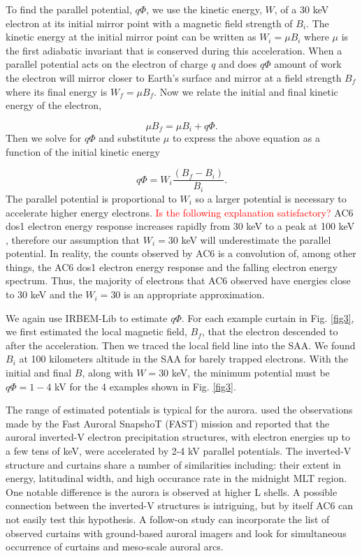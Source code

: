 \documentclass[draft]{agujournal2019}
\begin{document}
To find the parallel potential, $q \Phi$,  we use the kinetic energy, $W$, of a $30$ keV electron at its initial mirror point with a magnetic field strength of $B_i$. The kinetic energy at the initial mirror point can be written as $W_i = \mu B_i$ where $\mu$ is the first adiabatic invariant that is conserved during this acceleration. When a parallel potential acts on the electron of charge $q$ and does $q \Phi$ amount of work the electron will mirror closer to Earth's surface and mirror at a field strength $B_f$ where its final energy is $W_f = \mu B_f$. Now we relate the initial and final kinetic energy of the electron,

\begin{equation}
\mu B_f = \mu B_i + q \Phi.
\end{equation} Then we solve for $q \Phi$ and substitute $\mu$ to express the above equation as a function of the initial kinetic energy 

\begin{equation}
 q \Phi = W_i \frac{(B_f - B_i)}{B_i}.
\end{equation} The parallel potential is proportional to $W_i$ so a larger potential is necessary to accelerate higher energy electrons. \textcolor{red}{Is the following explanation satisfactory?} AC6 dos1 electron energy response increases rapidly from 30 keV to a peak at 100 keV \cite[Figure 2]{O'brien2019}, therefore our assumption that $W_i = 30$ keV will underestimate the parallel potential. In reality, the counts observed by AC6 is a convolution of, among other things, the AC6 dos1 electron energy response and the falling electron energy spectrum. Thus, the majority of electrons that AC6 observed have energies close to 30 keV and the $W_i = 30$ is an appropriate approximation.

We again use IRBEM-Lib to estimate $ q \Phi$. For each example curtain in Fig. \ref{fig3}, we first estimated the local magnetic field, $B_f$, that the electron descended to after the acceleration. Then we traced the local field line into the SAA. We found $B_i$ at 100 kilometers altitude in the SAA for barely trapped electrons. With the initial and final $B$, along with $W = 30$ keV, the minimum potential must be $q \Phi = 1-4$ kV for the 4 examples shown in Fig. \ref{fig3}. 

The range of estimated potentials is typical for the aurora.  used the observations made by the Fast Auroral SnapshoT (FAST) mission and reported that the auroral inverted-V electron precipitation structures, with electron energies up to a few tens of keV, were accelerated by 2-4 kV parallel potentials. The inverted-V structure and curtains share a number of similarities including: their extent in energy, latitudinal width, and high occurance rate in the midnight MLT region. One notable difference is the aurora is observed at higher L shells. A possible connection between the inverted-V structures is intriguing, but by itself AC6 can not easily test this hypothesis. A follow-on study can incorporate the list of observed curtains with ground-based auroral imagers and look for simultaneous occurrence of curtains and meso-scale auroral arcs.
\end{document}
